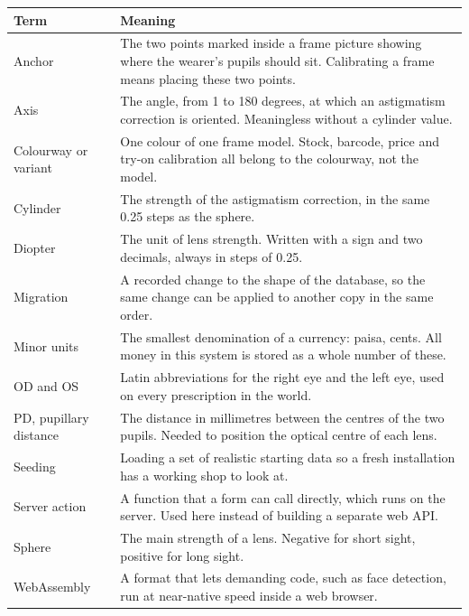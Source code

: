 \documentclass[11pt,a4paper]{report}
\begin{document}
\begin{longtable}{@{}p{}p{}@{}}
\toprule
\textbf{Term} & \textbf{Meaning}\\
\midrule
\endhead
Anchor & The two points marked inside a frame picture showing where the
wearer's pupils should sit. Calibrating a frame means placing these two
points.\\
\addlinespace
Axis & The angle, from 1 to 180 degrees, at which an astigmatism correction
is oriented. Meaningless without a cylinder value.\\
\addlinespace
Colourway or variant & One colour of one frame model. Stock, barcode, price
and try-on calibration all belong to the colourway, not the model.\\
\addlinespace
Cylinder & The strength of the astigmatism correction, in the same 0.25 steps
as the sphere.\\
\addlinespace
Diopter & The unit of lens strength. Written with a sign and two decimals,
always in steps of 0.25.\\
\addlinespace
Migration & A recorded change to the shape of the database, so the same change
can be applied to another copy in the same order.\\
\addlinespace
Minor units & The smallest denomination of a currency: paisa, cents. All money
in this system is stored as a whole number of these.\\
\addlinespace
OD and OS & Latin abbreviations for the right eye and the left eye, used on
every prescription in the world.\\
\addlinespace
PD, pupillary distance & The distance in millimetres between the centres of
the two pupils. Needed to position the optical centre of each lens.\\
\addlinespace
Seeding & Loading a set of realistic starting data so a fresh installation has
a working shop to look at.\\
\addlinespace
Server action & A function that a form can call directly, which runs on the
server. Used here instead of building a separate web API.\\
\addlinespace
Sphere & The main strength of a lens. Negative for short sight, positive for
long sight.\\
\addlinespace
WebAssembly & A format that lets demanding code, such as face detection, run
at near-native speed inside a web browser.\\
\bottomrule
\end{longtable}
\end{document}
